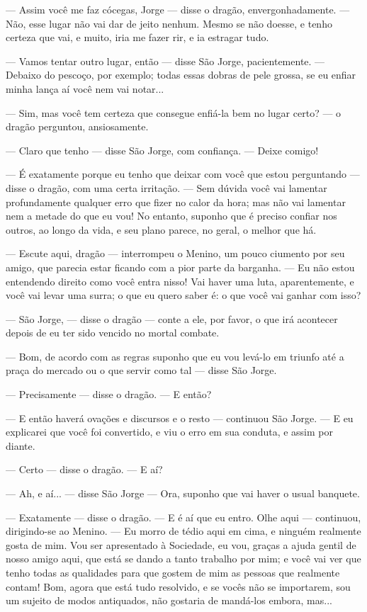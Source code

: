— Assim você me faz cócegas, Jorge — disse o dragão,
envergonhadamente. — Não, esse lugar não vai dar de jeito nenhum.
Mesmo se não doesse, e tenho certeza que vai, e muito, iria me fazer
rir, e ia estragar tudo.

— Vamos tentar outro lugar, então — disse São Jorge, pacientemente. —
Debaixo do pescoço, por exemplo; todas essas dobras de pele grossa,
se eu enfiar minha lança aí você nem vai notar...

— Sim, mas você tem certeza que consegue enfiá-la bem no lugar certo?
— o dragão perguntou, ansiosamente.

— Claro que tenho — disse São Jorge, com confiança. — Deixe comigo! 

— É exatamente porque eu tenho que deixar com você que estou
perguntando — disse o dragão, com uma certa irritação. — Sem dúvida
você vai lamentar profundamente qualquer erro que fizer no calor da
hora; mas não vai lamentar nem a metade do que eu vou! No entanto,
suponho que é preciso confiar nos outros, ao longo da vida, e seu
plano parece, no geral, o melhor que há.

— Escute aqui, dragão — interrompeu o Menino, um pouco ciumento por
seu amigo, que parecia estar ficando com a pior parte da barganha. —
Eu não estou entendendo direito como você entra nisso! Vai haver uma
luta, aparentemente, e você vai levar uma surra; o que eu quero saber
é: o que você vai ganhar com isso?

— São Jorge, — disse o dragão — conte a ele, por favor, o que irá
acontecer depois de eu ter sido vencido no mortal combate.

— Bom, de acordo com as regras suponho que eu vou levá-lo em triunfo
até a praça do mercado ou o que servir como tal — disse São Jorge.

— Precisamente — disse o dragão. — E então?

— E então haverá ovações e discursos e o resto — continuou São Jorge.
— E eu explicarei que você foi convertido, e viu o erro em sua
conduta, e assim por diante.

— Certo — disse o dragão. — E aí?

— Ah, e aí... — disse São Jorge — Ora, suponho que vai haver o usual
banquete.

— Exatamente — disse o dragão. — E é aí que eu entro. Olhe aqui —
continuou, dirigindo-se ao Menino. — Eu morro de tédio aqui em cima,
e ninguém realmente gosta de mim. Vou ser apresentado à Sociedade, eu
vou, graças a ajuda gentil de nosso amigo aqui, que está se dando a
tanto trabalho por mim; e você vai ver que tenho todas as qualidades
para que gostem de mim as pessoas que realmente contam! Bom, agora
que está tudo resolvido, e se vocês não se importarem, sou um sujeito
de modos antiquados, não gostaria de mandá-los embora, mas...

